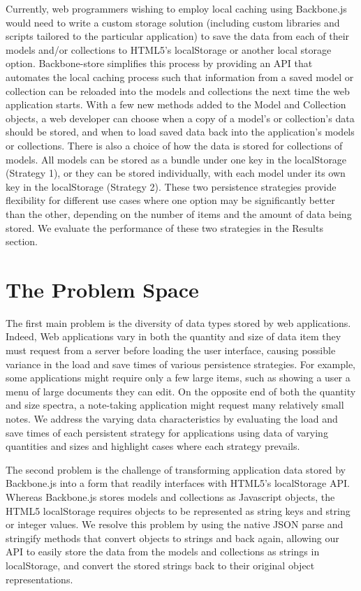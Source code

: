 \documentclass[12pt]{article}
\begin{document}
Currently, web programmers wishing to employ local caching using Backbone.js would need to write a custom storage solution (including custom libraries and scripts tailored to the particular application) to save the data from each of their models and/or collections to HTML5's localStorage or another local storage option. Backbone-store simplifies this process by providing an API that automates the local caching process such that information from a saved model or collection can be reloaded into the
models and collections the next time the web application starts. With a few new
methods added to the Model and Collection objects, a web developer can choose
when a copy of a model's or collection's data should be stored, and when to
load saved data back into the application's models or collections. There is
also a choice of how the data is stored for collections of models. All models
can be stored as a bundle under one key in the localStorage (Strategy 1), or they can be
stored individually, with each model under its own key in the localStorage (Strategy 2).
These two persistence strategies provide flexibility for different use cases where one option may be
significantly better than the other, depending on the number of items and
the amount of data being stored. We evaluate the performance of these two strategies in the Results section.

\section{The Problem Space}

The first main problem is the diversity of data types stored by web applications. Indeed, Web applications vary in both the quantity and size of data item they must request from a
server before loading the user interface, causing possible variance in the load and save times of various persistence strategies.  For example, some applications might require only a few
large items, such as showing a user a menu of large documents they can edit. On
the opposite end of both the quantity and size spectra, a note-taking application might request many
relatively small notes. We address the varying data characteristics by evaluating the load and save times of each persistent strategy for applications using data of varying quantities and sizes and highlight cases where each strategy prevails.

The second problem is the challenge of transforming application data stored by Backbone.js into a form that readily interfaces with HTML5's localStorage API. Whereas Backbone.js stores models and collections as Javascript objects, the HTML5 localStorage requires objects to be represented as string keys and string or integer values. We resolve this problem by using the native JSON parse and stringify methods that convert objects to strings and back again, allowing our API to easily
store the data from the models and collections as strings in localStorage, and
convert the stored strings back to their original object representations.
\end{document}
